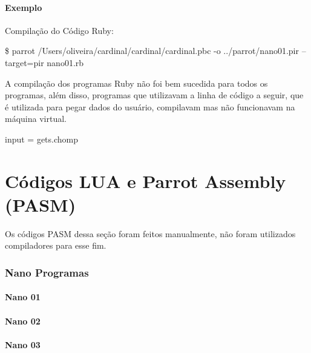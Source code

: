 \documentclass[12pt,a4paper,twoside]{report}
\begin{document}
\subsubsection{Exemplo}

Compilação do Código Ruby:
\begin{terminal}
\$ parrot /Users/oliveira/cardinal/cardinal/cardinal.pbc -o
../parrot/nano01.pir --target=pir nano01.rb
\end{terminal}


A compilação dos programas Ruby não foi bem sucedida para todos os programas, além disso, programas que utilizavam a linha de código a seguir, que é utilizada para pegar dados do usuário, compilavam mas não funcionavam na máquina virtual.
\begin{terminal}
input = gets.chomp
\end{terminal}


\chapter{Códigos LUA e Parrot Assembly (PASM)}

Os códigos PASM dessa seção foram feitos manualmente, não foram utilizados compiladores para esse fim.

\subsection{Nano Programas}
\subsubsection{Nano 01}



\subsubsection{Nano 02}



\subsubsection{Nano 03}


\end{document}
